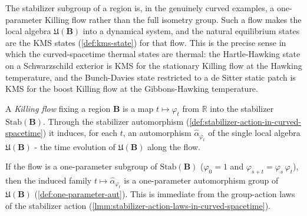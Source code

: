 The stabilizer subgroup of a region is, in the genuinely curved examples, a one-parameter Killing flow rather than the full isometry group. Such a flow makes the local algebra $\mathfrak{U}(\mathbf{B})$ into a dynamical system, and the natural equilibrium states are the KMS states (\ref{def:kms-state}) for that flow. This is the precise sense in which the curved-spacetime thermal states are thermal: the Hartle-Hawking state on a Schwarzschild exterior is KMS for the stationary Killing flow at the Hawking temperature, and the Bunch-Davies state restricted to a de Sitter static patch is KMS for the boost Killing flow at the Gibbons-Hawking temperature.

\begin{definition}
    \label{def:flow-aut-in-curved-spacetime}
    \leanok
    A \emph{Killing flow} fixing a region $\mathbf{B}$ is a map $t \mapsto \varphi_t$ from $\mathbb{R}$ into the stabilizer $\mathrm{Stab}(\mathbf{B})$. Through the stabilizer automorphism (\ref{def:stabilizer-action-in-curved-spacetime}) it induces, for each $t$, an automorphism $\hat\alpha_{\varphi_t}$ of the single local algebra $\mathfrak{U}(\mathbf{B})$ - the time evolution of $\mathfrak{U}(\mathbf{B})$ along the flow.
\end{definition}

\begin{lemma}
    \label{lmm:one-parameter-aut-flow-in-curved-spacetime}
    \leanok
    If the flow is a one-parameter subgroup of $\mathrm{Stab}(\mathbf{B})$ ($\varphi_0 = 1$ and $\varphi_{s+t} = \varphi_s\,\varphi_t$), then the induced family $t \mapsto \hat\alpha_{\varphi_t}$ is a one-parameter automorphism group of $\mathfrak{U}(\mathbf{B})$ (\ref{def:one-parameter-aut}). This is immediate from the group-action laws of the stabilizer action (\ref{lmm:stabilizer-action-laws-in-curved-spacetime}).
\end{lemma}

